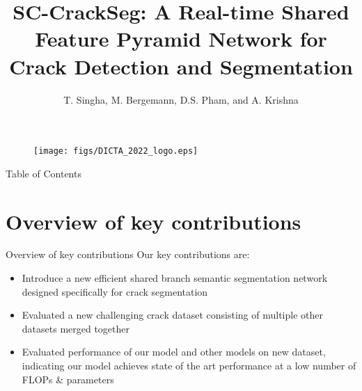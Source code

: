 \documentclass{lib/curtin_format}
\title[SC-CrackSeg]{\huge\textbf{SC-CrackSeg: A Real-time Shared Feature Pyramid
Network for Crack Detection and Segmentation}}
\author{T. Singha, M. Bergemann, D.S. Pham, and A. Krishna}
\institute[Curtin]{
    \normalsize{\email{}}
    \newline
    \department{School of EECMS}
    \curtin
}
\date{}
\begin{document}


\begin{frame}{}	

    \maketitle
	\vspace{-0.4cm}
	\begin{figure}
        \centering        
        \texttt{[image: figs/DICTA\_2022\_logo.eps]}
        \label{fig:logo}
	\end{figure}	

\end{frame}

\begin{frame}{Table of Contents}
        \tableofcontents
\end{frame}

\section{Overview of key contributions}
\begin{frame}{Overview of key contributions}
Our key contributions are:
	\begin{itemize}
		\item Introduce a new efficient shared branch semantic segmentation network designed specifically for crack segmentation
		\item Evaluated a new challenging crack dataset consisting of multiple other datasets merged together
		\item Evaluated performance of our model and other models on new dataset, indicating our model achieves state of the art performance at a low number of FLOPs \& parameters
	\end{itemize}
\end{frame}
\end{document}
